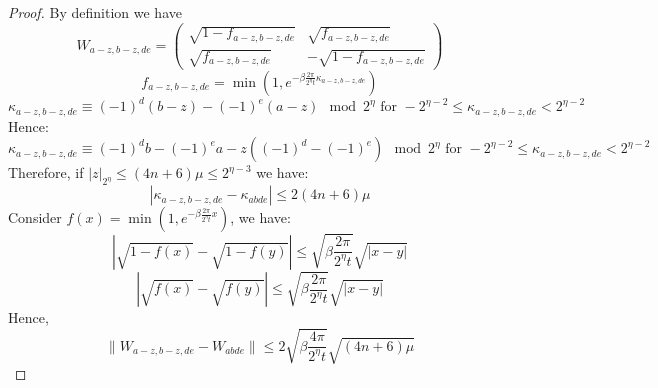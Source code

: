 \documentclass[aps,floatfix,10pt,amssymb,amsfont,amsmath,superscriptaddress,float,nofootinbib,longbibliography,nobalancelastpage,twocolumn]{revtex4-2}
\begin{document}
\begin{proof}
    By definition we have
\begin{equation}
     W_{a-z,b-z,de} = \begin{pmatrix}
        \sqrt{1 - f_{a-z,b-z,de}} & \sqrt{f_{a-z,b-z,de}}\\
       \sqrt{f_{a-z,b-z,de}} & -\sqrt{1 - f_{a-z,b-z,de}}
    \end{pmatrix}
\end{equation}
\begin{equation}
     f_{a-z,b-z,de} = \min(1,e^{-\beta \frac{2\pi}{2^{\eta}t}\kappa_{a-z,b-z,de}})
\end{equation}
\begin{equation}
    \kappa_{a-z,b-z,de} \equiv (-1)^d(b-z) - (-1)^e(a-z) \mod 2^{\eta} \text{ for } -2^{\eta-2} \leq \kappa_{a-z,b-z,de} < 2^{\eta-2}
\end{equation}
Hence:
\begin{equation}
    \kappa_{a-z,b-z,de} \equiv (-1)^db - (-1)^ea - z((-1)^d - (-1)^e) \mod 2^{\eta} \text{ for } -2^{\eta-2} \leq \kappa_{a-z,b-z,de} < 2^{\eta-2}
\end{equation}
Therefore, if $|z|_{2^{\eta}} \leq (4n+6)\mu\leq 2^{\eta-3}$ we have:
\begin{equation}
    |\kappa_{a-z,b-z,de} - \kappa_{abde}| \leq 2(4n+6)\mu
\end{equation}
Consider $f(x)=\min(1, e^{-\beta\frac{2\pi}{2^{\eta}t}x})$, we have:
\begin{equation}
    |\sqrt{1-f(x)} - \sqrt{1-f(y)}| \leq \sqrt{\beta\frac{2\pi}{2^{\eta}t}}\sqrt{|x-y|}
\end{equation}
\begin{equation}
    |\sqrt{f(x)} - \sqrt{f(y)}| \leq \sqrt{\beta\frac{2\pi}{2^{\eta}t}}\sqrt{|x-y|}
\end{equation}
Hence,
\begin{equation}
    \|W_{a-z,b-z,de} - W_{abde}\| \leq 2\sqrt{\beta\frac{4\pi}{2^{\eta}t}}\sqrt{(4n+6)\mu}
\end{equation}
\end{proof}
\clearpage
\end{document}
